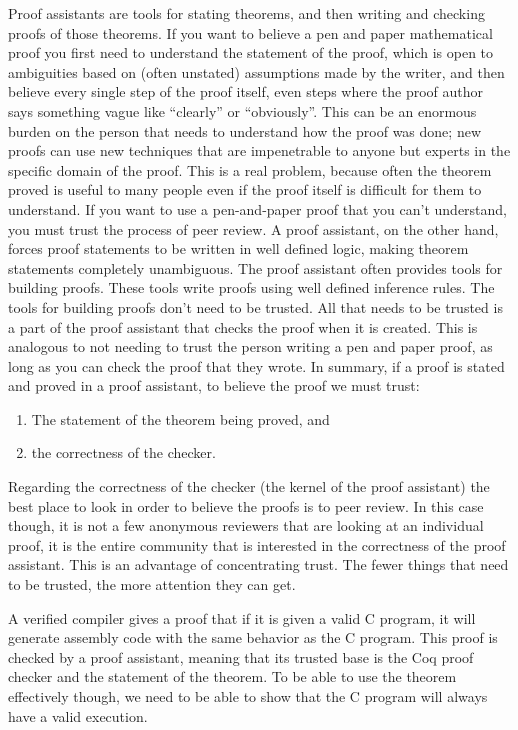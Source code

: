 \documentclass{puthesis}
\begin{document}
Proof assistants are tools for stating theorems, and then writing and
checking proofs of those theorems. If you want to believe a pen and
paper mathematical proof you first need to understand the statement of
the proof, which is open to ambiguities based on (often unstated)
assumptions made by the writer, and then believe every single step of
the proof itself, even steps where the proof author says something
vague like ``clearly'' or ``obviously''. This can be an enormous
burden on the person that needs to understand how the proof was done;
new proofs can use new techniques that are impenetrable to anyone but
experts in the specific domain of the proof. This is a real problem,
because often the theorem proved is useful to many people even if the
proof itself is difficult for them to understand. If you want to use a
pen-and-paper proof that you can't understand, you must trust the
process of peer review. 
A proof assistant, on the other hand, forces proof statements to be
written in well defined logic, making theorem statements completely
unambiguous. The proof assistant often provides tools for building
proofs. These tools write proofs using well defined inference rules.
The tools for building proofs don't need to be
trusted. All that needs to be trusted is a part of the proof assistant
that checks the proof when it is created. This is analogous to not
needing to trust the person writing a pen and paper proof, as long as
you can check the proof that they wrote. In summary, if a proof is
stated and proved in a proof assistant, to believe the proof we must
trust:

\begin{enumerate}
  \item The statement of the theorem being proved, and
  \item the correctness of the checker. 
\end{enumerate}

Regarding the correctness of the checker (the kernel of the proof
assistant) the best place to look in order to believe the proofs is to
peer review. In this case though, it is not a few anonymous reviewers
that are looking at an individual proof, it is the entire community
that is interested in the correctness of the proof assistant. This is
an advantage of concentrating trust. The fewer things that need to be
trusted, the more attention they can get.


A verified compiler gives a proof that if it is given a valid C
program, it will generate assembly code with the same behavior as the
C program. This proof is checked by a proof assistant, meaning that
its trusted base is the Coq proof checker and the statement of the
theorem. To be able to use the theorem effectively though, we need to
be able to show that the C program will always have a valid execution.
\end{document}
